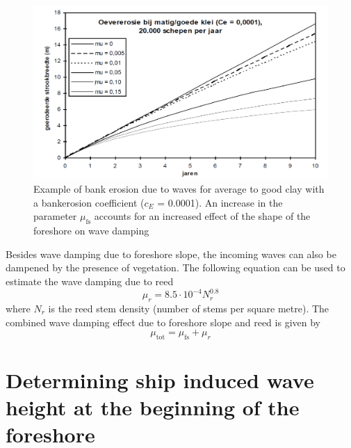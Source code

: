 \begin{figure}[!hb]
\includegraphics[width=\textwidth]{figures/Fig4-2.png}
\caption{Example of bank erosion due to waves for average to good clay with a bankerosion coefficient ($c_E$ = 0.0001). An increase in the parameter $\mu_\text{fs}$ accounts for an increased effect of the shape of the foreshore on wave damping}
\label{Fig4.2}
\end{figure}

Besides wave damping due to foreshore slope, the incoming waves can also be dampened by the presence of vegetation.
The following equation can be used to estimate the wave damping due to reed
%
\begin{equation}
\mu_r = 8.5 \cdot 10^{-4} N_r^{0.8}
\end{equation}
%
where $N_r$ is the reed stem density (number of stems per square metre).
The combined wave damping effect due to foreshore slope and reed is given by
%
\begin{equation}
\mu_\text{tot} = \mu_\text{fs} + \mu_r
\end{equation}
%
\clearpage
\section{Determining ship induced wave height at the beginning of the foreshore} \label{Sec:shipwaves}

